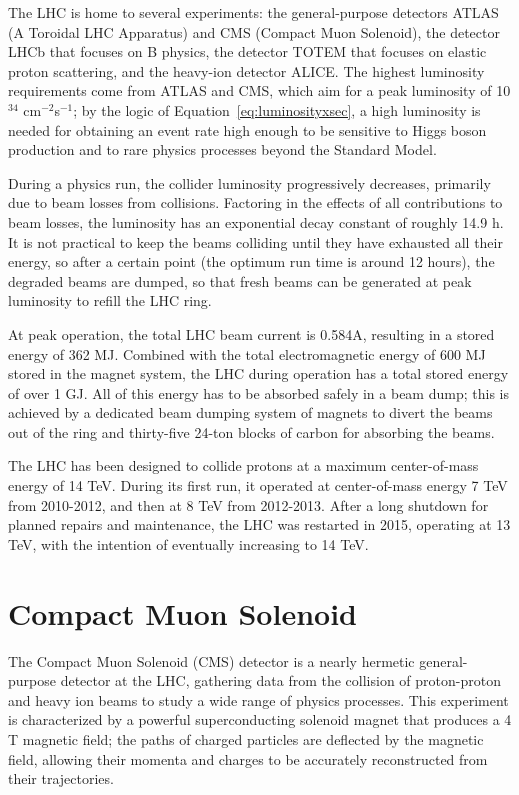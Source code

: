 The LHC is home to several experiments: the general-purpose detectors ATLAS (A Toroidal LHC Apparatus) and CMS (Compact Muon Solenoid), the detector LHCb that focuses on B physics, the detector TOTEM that focuses on elastic proton scattering, and the heavy-ion detector ALICE. The highest luminosity requirements come from ATLAS and CMS, which aim for a peak luminosity of 10$^{34}$ cm$^{-2}$s$^{-1}$; by the logic of Equation~\ref{eq:luminosityxsec}, a high luminosity is needed for obtaining an event rate high enough to be sensitive to Higgs boson production and to rare physics processes beyond the Standard Model.

During a physics run, the collider luminosity progressively decreases, primarily due to beam losses from collisions. Factoring in the effects of all contributions to beam losses, the luminosity has an exponential decay constant of roughly 14.9 h. It is not practical to keep the beams colliding until they have exhausted all their energy, so after a certain point (the optimum run time is around 12 hours), the degraded beams are dumped, so that fresh beams can be generated at peak luminosity to refill the LHC ring.

At peak operation, the total LHC beam current is 0.584A, resulting in a stored energy of 362 MJ. Combined with the total electromagnetic energy of 600 MJ stored in the magnet system, the LHC during operation has a total stored energy of over 1 GJ. All of this energy has to be absorbed safely in a beam dump; this is achieved by a dedicated beam dumping system of magnets to divert the beams out of the ring and thirty-five 24-ton blocks of carbon for absorbing the beams.

The LHC has been designed to collide protons at a maximum center-of-mass energy of 14 TeV. During its first run, it operated at center-of-mass energy 7 TeV from 2010-2012, and then at 8 TeV from 2012-2013. After a long shutdown for planned repairs and maintenance, the LHC was restarted in 2015, operating at 13 TeV, with the intention of eventually increasing to 14 TeV.

\section{Compact Muon Solenoid\label{sec:cms}}

The Compact Muon Solenoid (CMS) detector is a nearly hermetic general-purpose detector at the LHC, gathering data from the collision of proton-proton and heavy ion beams to study a wide range of physics processes. This experiment is characterized by a powerful superconducting solenoid magnet that produces a 4 T magnetic field; the paths of charged particles are deflected by the magnetic field, allowing their momenta and charges to be accurately reconstructed from their trajectories.


